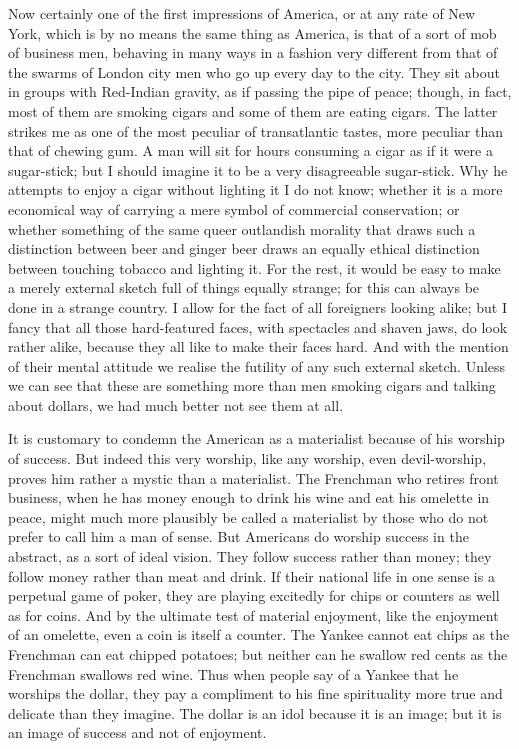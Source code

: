 \documentclass{book}
\begin{document}
Now certainly one of the first impressions of America, or at any rate of New York, which is by no means the same thing as America, is that of a sort of mob of business men, behaving in many ways in a fashion very different from that of the swarms of London city men who go up every day to the city. They sit about in groups with Red-Indian gravity, as if passing the pipe of peace; though, in fact, most of them are smoking cigars and some of them are eating cigars. The latter strikes me as one of the most peculiar of transatlantic tastes, more peculiar than that of chewing gum. A man will sit for hours consuming a cigar as if it were a sugar-stick; but I should imagine it to be a very disagreeable sugar-stick. Why he attempts to enjoy a cigar without lighting it I do not know; whether it is a more economical way of carrying a mere symbol of commercial conservation; or whether something of the same queer outlandish morality that draws such a distinction between beer and ginger beer draws an equally ethical distinction between touching tobacco and lighting it. For the rest, it would be easy to make a merely external sketch full of things equally strange; for this can always be done in a strange country. I allow for the fact of all foreigners looking alike; but I fancy that all those hard-featured faces, with spectacles and shaven jaws, do look rather alike, because they all like to make their faces hard. And with the mention of their mental attitude we realise the futility of any such external sketch. Unless we can see that these are something more than men smoking cigars and talking about dollars, we had much better not see them at all.

It is customary to condemn the American as a materialist because of his worship of success. But indeed this very worship, like any worship, even devil-worship, proves him rather a mystic than a materialist. The Frenchman who retires front business, when he has money enough to drink his wine and eat his omelette in peace, might much more plausibly be called a materialist by those who do not prefer to call him a man of sense. But Americans do worship success in the abstract, as a sort of ideal vision. They follow success rather than money; they follow money rather than meat and drink. If their national life in one sense is a perpetual game of poker, they are playing excitedly for chips or counters as well as for coins. And by the ultimate test of material enjoyment, like the enjoyment of an omelette, even a coin is itself a counter. The Yankee cannot eat chips as the Frenchman can eat chipped potatoes; but neither can he swallow red cents as the Frenchman swallows red wine. Thus when people say of a Yankee that he worships the dollar, they pay a compliment to his fine spirituality more true and delicate than they imagine. The dollar is an idol because it is an image; but it is an image of success and not of enjoyment.
\end{document}
